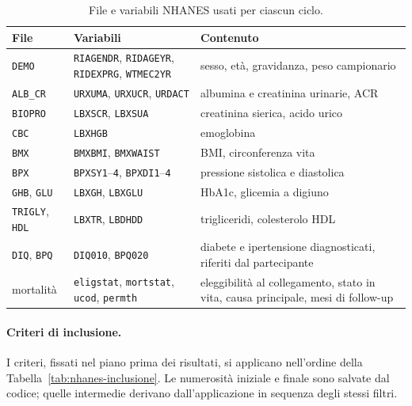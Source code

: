 \documentclass[a4paper, 12pt, oneside]{book}
\begin{document}
\begin{table}[H]
	\centering
	\small
	\caption{File e variabili NHANES usati per ciascun ciclo.}
	\label{tab:nhanes-file}
	\begin{tabularx}{\textwidth}{@{}l >{\raggedright\arraybackslash}p{5.2cm} >{\raggedright\arraybackslash}X@{}}
		\toprule
		File & Variabili & Contenuto \\
		\midrule
		\texttt{DEMO} & \texttt{RIAGENDR}, \texttt{RIDAGEYR}, \texttt{RIDEXPRG}, \texttt{WTMEC2YR} & sesso, età, gravidanza, peso campionario \\
		\texttt{ALB\_CR} & \texttt{URXUMA}, \texttt{URXUCR}, \texttt{URDACT} & albumina e creatinina urinarie, ACR \\
		\texttt{BIOPRO} & \texttt{LBXSCR}, \texttt{LBXSUA} & creatinina sierica, acido urico \\
		\texttt{CBC} & \texttt{LBXHGB} & emoglobina \\
		\texttt{BMX} & \texttt{BMXBMI}, \texttt{BMXWAIST} & BMI, circonferenza vita \\
		\texttt{BPX} & \texttt{BPXSY1}--\texttt{4}, \texttt{BPXDI1}--\texttt{4} & pressione sistolica e diastolica \\
		\texttt{GHB}, \texttt{GLU} & \texttt{LBXGH}, \texttt{LBXGLU} & HbA1c, glicemia a digiuno \\
		\texttt{TRIGLY}, \texttt{HDL} & \texttt{LBXTR}, \texttt{LBDHDD} & trigliceridi, colesterolo HDL \\
		\texttt{DIQ}, \texttt{BPQ} & \texttt{DIQ010}, \texttt{BPQ020} & diabete e ipertensione diagnosticati, riferiti dal partecipante \\
		mortalità & \texttt{eligstat}, \texttt{mortstat}, \texttt{ucod}, \texttt{permth} & eleggibilità al collegamento, stato in vita, causa principale, mesi di follow-up \\
		\bottomrule
	\end{tabularx}
\end{table}

\paragraph{Criteri di inclusione.} I criteri, fissati nel piano prima dei risultati, si applicano nell'ordine della Tabella~\ref{tab:nhanes-inclusione}. Le numerosità iniziale e finale sono salvate dal codice; quelle intermedie derivano dall'applicazione in sequenza degli stessi filtri.
\end{document}
